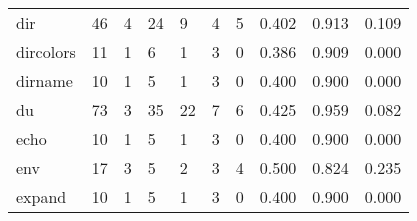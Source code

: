 \begin{longtable}{lp{1.3cm}p{1.3cm}p{1.3cm}p{1.3cm}p{1.3cm}p{1.3cm}p{1.3cm}p{1.3cm}p{1.3cm}}
dir       &                     46 &                                             4 &                                           24 &                                           9 &                                            4 &                                          5 &                                0.402 &                                  0.913 &                                0.109 \\
dircolors &                     11 &                                             1 &                                            6 &                                           1 &                                            3 &                                          0 &                                0.386 &                                  0.909 &                                0.000 \\
dirname   &                     10 &                                             1 &                                            5 &                                           1 &                                            3 &                                          0 &                                0.400 &                                  0.900 &                                0.000 \\
du        &                     73 &                                             3 &                                           35 &                                          22 &                                            7 &                                          6 &                                0.425 &                                  0.959 &                                0.082 \\
echo      &                     10 &                                             1 &                                            5 &                                           1 &                                            3 &                                          0 &                                0.400 &                                  0.900 &                                0.000 \\
env       &                     17 &                                             3 &                                            5 &                                           2 &                                            3 &                                          4 &                                0.500 &                                  0.824 &                                0.235 \\
expand    &                     10 &                                             1 &                                            5 &                                           1 &                                            3 &                                          0 &                                0.400 &                                  0.900 &                                0.000 \\

\end{longtable}
